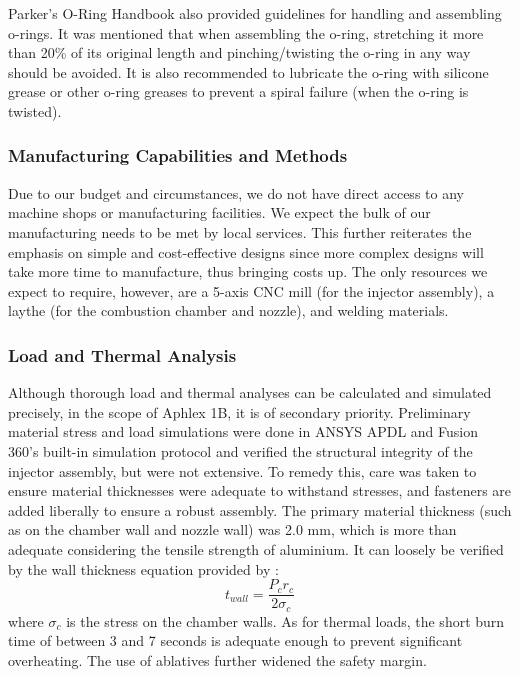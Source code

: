 \documentclass[9pt]{article} %
\numberwithin{equation}{section} %
\begin{document}
 Parker's O-Ring Handbook also provided guidelines for handling and assembling o-rings. It was mentioned that when assembling the o-ring, stretching it more than 20\% of its original length and pinching/twisting the o-ring in any way should be avoided. It is also recommended to lubricate the o-ring with silicone grease or other o-ring greases to prevent a spiral failure (when the o-ring is twisted).

\subsubsection{Manufacturing Capabilities and Methods}

\hspace{\parindent} Due to our budget and circumstances, we do not have direct access to any machine shops or manufacturing facilities. We expect the bulk of our manufacturing needs to be met by local services. This further reiterates the emphasis on simple and cost-effective designs since more complex designs will take more time to manufacture, thus bringing costs up. The only resources we expect to require, however, are a 5-axis CNC mill (for the injector assembly), a laythe (for the combustion chamber and nozzle), and welding materials.

\subsubsection{Load and Thermal Analysis}

\hspace{\parindent} Although thorough load and thermal analyses can be calculated and simulated precisely, in the scope of Aphlex 1B, it is of secondary priority. Preliminary material stress and load simulations were done in ANSYS APDL and Fusion 360's built-in simulation protocol and verified the structural integrity of the injector assembly, but were not extensive. To remedy this, care was taken to ensure material thicknesses were adequate to withstand stresses, and fasteners are added liberally to ensure a robust assembly. The primary material thickness (such as on the chamber wall and nozzle wall) was 2.0 mm, which is more than adequate considering the tensile strength of aluminium. It can loosely be verified by the wall thickness equation provided by \cite{intro-rocket}:
\begin{equation}
t_{wall} = \frac{P_{c}r_{c}}{2\sigma_{c}}
\end{equation}
where $\sigma_{c}$ is the stress on the chamber walls. As for thermal loads, the short burn time of between 3 and 7 seconds is adequate enough to prevent significant overheating. The use of ablatives further widened the safety margin.
\end{document}
